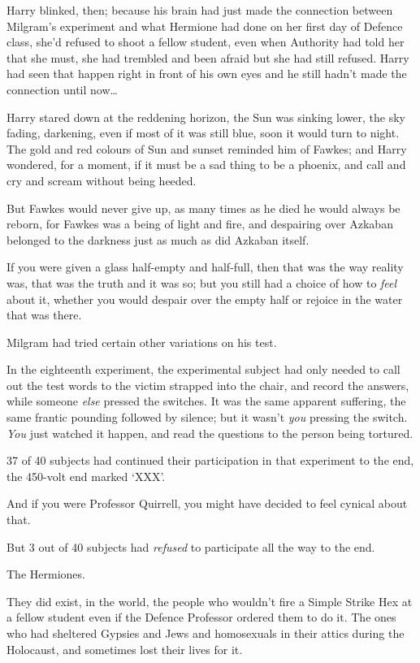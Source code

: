 Harry blinked, then; because his brain had just made the connection between
Milgram's experiment and what Hermione had done on her first day of Defence
class, she'd refused to shoot a fellow student, even when Authority had told
her that she must, she had trembled and been afraid but she had still refused.
Harry had seen that happen right in front of his own eyes and he still hadn't
made the connection until now…

Harry stared down at the reddening horizon, the Sun was sinking lower, the sky
fading, darkening, even if most of it was still blue, soon it would turn to
night. The gold and red colours of Sun and sunset reminded him of Fawkes; and
Harry wondered, for a moment, if it must be a sad thing to be a phoenix, and
call and cry and scream without being heeded.

But Fawkes would never give up, as many times as he died he would always be
reborn, for Fawkes was a being of light and fire, and despairing over Azkaban
belonged to the darkness just as much as did Azkaban itself.

If you were given a glass half-empty and half-full, then that was the way
reality was, that was the truth and it was so; but you still had a choice of
how to \emph{feel} about it, whether you would despair over the empty half or
rejoice in the water that was there.

Milgram had tried certain other variations on his test.

In the eighteenth experiment, the experimental subject had only needed to call
out the test words to the victim strapped into the chair, and record the
answers, while someone \emph{else} pressed the switches. It was the same
apparent suffering, the same frantic pounding followed by silence; but it
wasn't \emph{you} pressing the switch. \emph{You} just watched it happen, and
read the questions to the person being tortured.

37 of 40 subjects had continued their participation in that experiment to the
end, the 450-volt end marked `XXX'.

And if you were Professor Quirrell, you might have decided to feel cynical
about that.

But 3 out of 40 subjects had \emph{refused} to participate all the way to the
end.

The Hermiones.

They did exist, in the world, the people who wouldn't fire a Simple Strike Hex
at a fellow student even if the Defence Professor ordered them to do it. The
ones who had sheltered Gypsies and Jews and homosexuals in their attics during
the Holocaust, and sometimes lost their lives for it.

